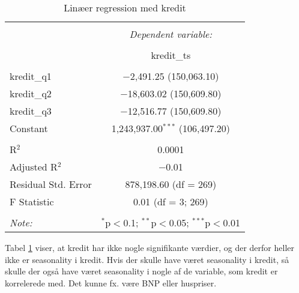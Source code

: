 \documentclass[
  10pt,
]{article}
\begin{document}
\begin{table}[!htbp] \centering 
  \caption{Linæer regression med kredit} 
  \label{tab:tabel2} 
\begin{tabular}{@{\extracolsep{5pt}}lc} 
\\[-1.8ex]\hline 
\hline \\[-1.8ex] 
 & \multicolumn{1}{c}{\textit{Dependent variable:}} \\ 
\cline{2-2} 
\\[-1.8ex] & kredit\_ts \\ 
\hline \\[-1.8ex] 
 kredit\_q1 & $-$2,491.25 (150,063.10) \\ 
  kredit\_q2 & $-$18,603.02 (150,609.80) \\ 
  kredit\_q3 & $-$12,516.77 (150,609.80) \\ 
  Constant & 1,243,937.00$^{***}$ (106,497.20) \\ 
 \hline \\[-1.8ex] 
R$^{2}$ & 0.0001 \\ 
Adjusted R$^{2}$ & $-$0.01 \\ 
Residual Std. Error & 878,198.60 (df = 269) \\ 
F Statistic & 0.01 (df = 3; 269) \\ 
\hline 
\hline \\[-1.8ex] 
\textit{Note:}  & \multicolumn{1}{r}{$^{*}$p$<$0.1; $^{**}$p$<$0.05; $^{***}$p$<$0.01} \\ 
\end{tabular} 
\end{table}

Tabel \ref{tab:tabel2} viser, at kredit har ikke nogle signifikante
værdier, og der derfor heller ikke er seasonality i kredit. Hvis der
skulle have været seasonality i kredit, så skulle der også have været
seasonality i nogle af de variable, som kredit er korrelerede med. Det
kunne fx. være BNP eller huspriser.
\end{document}
